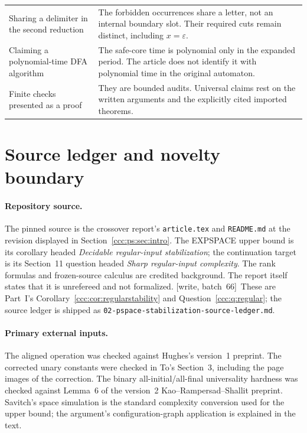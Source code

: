 \documentclass[11pt,letterpaper]{article}
\theoremstyle{definition}
\theoremstyle{remark}
\newcommand{\eps}{\varepsilon}
\newcommand{\wsix}{\textup{[write, batch~66]}}
\begin{document}
\begin{longtable}{@{}L{.28\textwidth}L{.66\textwidth}@{}}
Sharing a delimiter in the second reduction & The forbidden occurrences share a letter, not an internal boundary slot. Their required cuts remain distinct, including $x=\eps$.\\[4pt]
Claiming a polynomial-time DFA algorithm & The safe-core time is polynomial only in the expanded period. The article does not identify it with polynomial time in the original automaton.\\[4pt]
Finite checks presented as a proof & They are bounded audits. Universal claims rest on the written arguments and the explicitly cited imported theorems.\\
\bottomrule
\end{longtable}

\section{Source ledger and novelty boundary}\label{ccc:ps:app:sources}

\paragraph{Repository source.}
The pinned source is the crossover report's \nolinkurl{article.tex} and
\nolinkurl{README.md} at the revision displayed in
Section~\ref{ccc:ps:sec:intro}. The EXPSPACE upper bound is its corollary headed
\emph{Decidable regular-input stabilization}; the continuation target is
its Section~11 question headed \emph{Sharp regular-input complexity}.
The rank formulas and frozen-source calculus are credited background.
The report itself states that it is unrefereed and not formalized.
\wsix\ These are Part~I's Corollary~\ref{ccc:cor:regularstability} and
Question~\ref{ccc:q:regular}; the source ledger is shipped as
\nolinkurl{02-pspace-stabilization-source-ledger.md}.

\paragraph{Primary external inputs.}
The aligned operation was checked against Hughes's version~1 preprint.
The corrected unary constants were checked in To's Section~3, including
the page images of the correction. The binary all-initial/all-final
universality hardness was checked against Lemma~6 of the version~2
Kao--Rampersad--Shallit preprint. Savitch's space simulation is the
standard complexity conversion used for the upper bound; the argument's
configuration-graph application is explained in the text.
\end{document}

